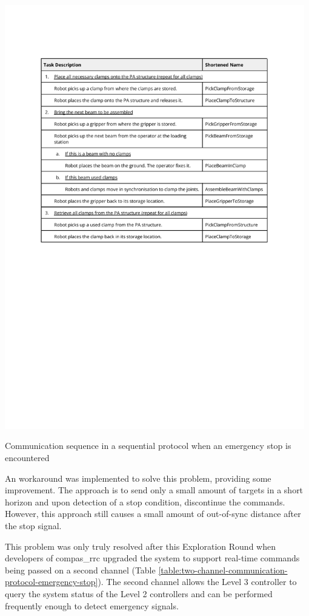 \begin{table}[!h]
    \includegraphics[page=7, trim=25.4mm 200mm 25.4mm 25mm, clip, width=0.98\textwidth]{tables/Tables in Chapter 6.pdf}
    \caption{Communication sequence in a sequential protocol when an emergency stop is encountered}
    \label{table:sequential-communication-protocol-emergency-stop}
\end{table}

An workaround was implemented to solve this problem, providing some improvement. The approach is to send only a small amount of targets in a short horizon and upon detection of a stop condition, discontinue the commands. However, this approach still causes a small amount of out-of-sync distance after the stop signal.

This problem was only truly resolved after this Exploration Round when developers of compas\_rrc upgraded the system to support real-time commands being passed on a second channel (Table \ref{table:two-channel-communication-protocol-emergency-stop}). The second channel allows the Level 3 controller to query the system status of the Level 2 controllers and can be performed frequently enough to detect emergency signals.

